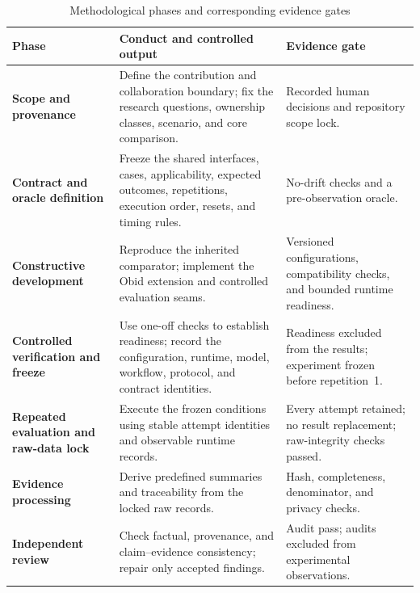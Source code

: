 \begin{table}[H]
\centering
\caption{Methodological phases and corresponding evidence gates}
\label{tab:method-phases}

\begingroup
\small
\setlength{\tabcolsep}{4pt}
\renewcommand{\arraystretch}{1.15}

\begin{tabularx}{\textwidth}{
  @{}
  L{0.19\textwidth}
  Y
  L{0.28\textwidth}
  @{}
}
\toprule
\textbf{Phase}
&
\textbf{Conduct and controlled output}
&
\textbf{Evidence gate}
\\
\midrule

\textbf{Scope and provenance}
&
Define the contribution and collaboration boundary; fix the research
questions, ownership classes, scenario, and core comparison.
&
Recorded human decisions and repository scope lock.
\\
\addlinespace[2pt]

\textbf{Contract and oracle definition}
&
Freeze the shared interfaces, cases, applicability, expected outcomes,
repetitions, execution order, resets, and timing rules.
&
No-drift checks and a pre-observation oracle.
\\
\addlinespace[2pt]

\textbf{Constructive development}
&
Reproduce the inherited comparator; implement the Obid extension and
controlled evaluation seams.
&
Versioned configurations, compatibility checks, and bounded runtime
readiness.
\\
\addlinespace[2pt]

\textbf{Controlled verification and freeze}
&
Use one-off checks to establish readiness; record the configuration,
runtime, model, workflow, protocol, and contract identities.
&
Readiness excluded from the results; experiment frozen before
repetition~1.
\\
\addlinespace[2pt]

\textbf{Repeated evaluation and raw-data lock}
&
Execute the frozen conditions using stable attempt identities and
observable runtime records.
&
Every attempt retained; no result replacement; raw-integrity checks
passed.
\\
\addlinespace[2pt]

\textbf{Evidence processing}
&
Derive predefined summaries and traceability from the locked raw
records.
&
Hash, completeness, denominator, and privacy checks.
\\
\addlinespace[2pt]

\textbf{Independent review}
&
Check factual, provenance, and claim--evidence consistency; repair only
accepted findings.
&
Audit pass; audits excluded from experimental observations.
\\

\bottomrule
\end{tabularx}
\endgroup
\end{table}

